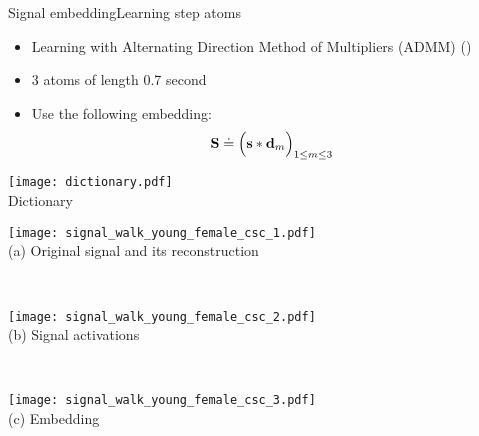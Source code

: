 \begin{frame}{Signal embedding}{Learning step atoms}

\renewcommand{\ratio}{0.9}
\centering
\begin{minipage}[t]{0.45\linewidth}
    \vspace{0pt}
    \begin{itemize}
        \item Learning with Alternating Direction Method of Multipliers (ADMM) (\citet{bristow2013fast})
            \item 3 atoms of length 0.7 second

        \pause[3]
        \item Use the following embedding:
        \begin{equation*}\label{eq: convolutional embedding}
        \mathbf{S} \doteq \Big( \mathbf{s} * \mathbf{d}_m\Big)_{1 \le m \le 3 }
        \end{equation*}
    \end{itemize}

    \centering
    \texttt{[image: dictionary.pdf]}\\
    \smallskip
    {\small Dictionary}
\end{minipage}
\begin{minipage}[t]{0.54\linewidth}
    \vspace{0pt}
    \renewcommand{\ratio}{0.8}
        \begin{minipage}{\linewidth}
            \centering
            \texttt{[image: signal\_walk\_young\_female\_csc\_1.pdf]}\\
            {\small (a)\; Original signal and its reconstruction}
        \end{minipage}\\
        \begin{minipage}{\linewidth}
            \centering
            \texttt{[image: signal\_walk\_young\_female\_csc\_2.pdf]}\\
            {\small (b)\; Signal activations}
        \end{minipage}\\
        \begin{minipage}{\linewidth}
            \centering
            \texttt{[image: signal\_walk\_young\_female\_csc\_3.pdf]}\\
            {\small (c)\; Embedding}
        \end{minipage}
\end{minipage}

\end{frame}


